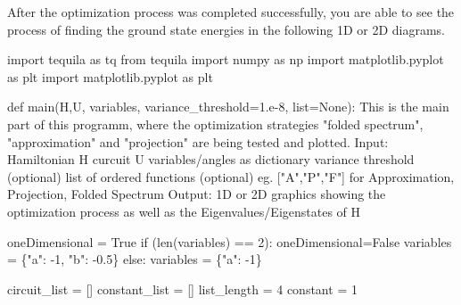 \documentclass[
  letterpaper,
  DIV=11,
  numbers=noendperiod]{scrartcl}
\newenvironment{Shaded}{\begin{snugshade}}{\end{snugshade}}
\newcommand{\BuiltInTok}[1]{\textcolor[rgb]{0.00,0.23,0.31}{#1}}
\newcommand{\CommentTok}[1]{\textcolor[rgb]{0.37,0.37,0.37}{#1}}
\newcommand{\ControlFlowTok}[1]{\textcolor[rgb]{0.00,0.23,0.31}{#1}}
\newcommand{\DecValTok}[1]{\textcolor[rgb]{0.68,0.00,0.00}{#1}}
\newcommand{\FloatTok}[1]{\textcolor[rgb]{0.68,0.00,0.00}{#1}}
\newcommand{\ImportTok}[1]{\textcolor[rgb]{0.00,0.46,0.62}{#1}}
\newcommand{\KeywordTok}[1]{\textcolor[rgb]{0.00,0.23,0.31}{#1}}
\newcommand{\NormalTok}[1]{\textcolor[rgb]{0.00,0.23,0.31}{#1}}
\newcommand{\OperatorTok}[1]{\textcolor[rgb]{0.37,0.37,0.37}{#1}}
\newcommand{\StringTok}[1]{\textcolor[rgb]{0.13,0.47,0.30}{#1}}
\newcommand{\VariableTok}[1]{\textcolor[rgb]{0.07,0.07,0.07}{#1}}
\begin{document}
After the optimization process was completed successfully, you are able
to see the process of finding the ground state energies in the following
1D or 2D diagrams.

\begin{Shaded}
\begin{Highlighting}[]
\ImportTok{import}\NormalTok{ tequila }\ImportTok{as}\NormalTok{ tq}
\ImportTok{from}\NormalTok{ tequila }\ImportTok{import}\NormalTok{ numpy }\ImportTok{as}\NormalTok{ np}
\ImportTok{import}\NormalTok{ matplotlib.pyplot }\ImportTok{as}\NormalTok{ plt}
\ImportTok{import}\NormalTok{ matplotlib.pyplot }\ImportTok{as}\NormalTok{ plt}

\KeywordTok{def}\NormalTok{ main(H,U, variables, variance\_threshold}\OperatorTok{=}\FloatTok{1.e{-}8}\NormalTok{, }\BuiltInTok{list}\OperatorTok{=}\VariableTok{None}\NormalTok{):}
    \CommentTok{\textquotesingle{}\textquotesingle{}\textquotesingle{}This is the main part of this programm, where the optimization strategies "folded spectrum", "approximation" and "projection"}
\CommentTok{    are being tested and plotted.}
\CommentTok{    Input:  Hamiltonian H}
\CommentTok{            curcuit U}
\CommentTok{            variables/angles as dictionary}
\CommentTok{            variance threshold (optional)}
\CommentTok{            list of ordered functions (optional) eg. ["A","P","F"] for Approximation, Projection, Folded Spectrum}
\CommentTok{    Output: 1D or 2D graphics showing the optimization process as well as the Eigenvalues/Eigenstates of H\textquotesingle{}\textquotesingle{}\textquotesingle{}}

\NormalTok{    oneDimensional }\OperatorTok{=} \VariableTok{True}
    \ControlFlowTok{if}\NormalTok{ (}\BuiltInTok{len}\NormalTok{(variables) }\OperatorTok{==} \DecValTok{2}\NormalTok{):}
\NormalTok{        oneDimensional}\OperatorTok{=}\VariableTok{False}
\NormalTok{        variables }\OperatorTok{=}\NormalTok{ \{}\StringTok{"a"}\NormalTok{: }\OperatorTok{{-}}\DecValTok{1}\NormalTok{, }\StringTok{"b"}\NormalTok{: }\OperatorTok{{-}}\FloatTok{0.5}\NormalTok{\}}
    \ControlFlowTok{else}\NormalTok{:}
\NormalTok{        variables }\OperatorTok{=}\NormalTok{ \{}\StringTok{"a"}\NormalTok{: }\OperatorTok{{-}}\DecValTok{1}\NormalTok{\}}

\NormalTok{    circuit\_list }\OperatorTok{=}\NormalTok{ []}
\NormalTok{    constant\_list }\OperatorTok{=}\NormalTok{ []}
\NormalTok{    list\_length }\OperatorTok{=} \DecValTok{4}
\NormalTok{    constant }\OperatorTok{=} \DecValTok{1}
    

\end{Highlighting}
\end{Shaded}
\end{document}
